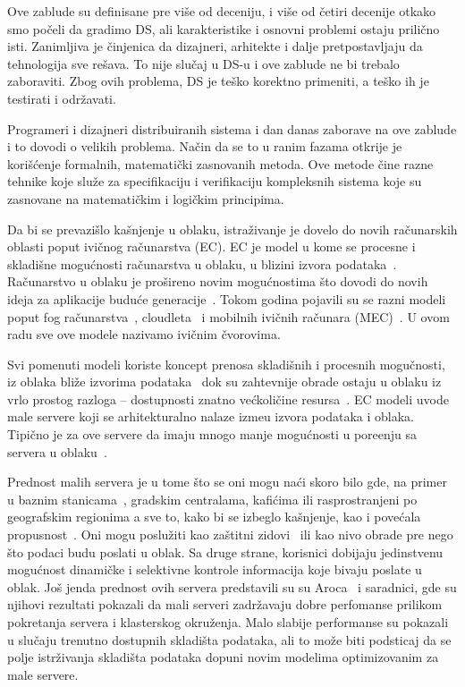 Ove zablude su definisane pre vi\v se od deceniju, i više od \v cetiri decenije otkako smo po\v celi da gradimo DS, ali karakteristike i osnovni problemi ostaju prili\v cno isti. Zanimljiva je \v cinjenica da dizajneri, arhitekte i dalje pretpostavljaju da tehnologija sve re\v sava. To nije slu\v caj u DS-u i ove zablude ne bi trebalo zaboraviti. Zbog ovih problema, DS je te\v sko korektno primeniti, a te\v sko ih je testirati i odr\v zavati.

Programeri i dizajneri distribuiranih sistema i dan danas zaborave na ove zablude i to dovodi o velikih problema. Na\v cin da se to u ranim fazama otkrije je kori\v s\'cenje formalnih, matemati\v cki zasnovanih metoda. Ove metode \v cine razne tehnike koje slu\v ze za specifikaciju i verifikaciju kompleksnih sistema koje su zasnovane na matemati\v ckim i logi\v ckim principima.

Da bi se prevazi\v slo ka\v snjenje u oblaku, istra\v zivanje je dovelo do novih ra\v cunarskih oblasti poput ivi\v cnog ra\v cunarstva (EC). EC je model u kome se procesne i skladi\v sne mogu\'cnosti ra\v cunarstva u oblaku, u blizini izvora podataka~\cite{Satyanarayanan17}. Ra\v cunarstvo u oblaku je pro\v sireno novim mogu\'cnostima \v sto dovodi do novih ideja za aplikacije budu\'ce generacije~\cite{NingLSY20}. Tokom godina pojavili su se razni modeli poput fog ra\v cunarstva~\cite{BonomiMNZ14}, cloudleta~\cite {MonsalveCC18} i mobilnih ivi\v cnih ra\v cunara (MEC)~\cite{WangZZWYW17}. U ovom radu sve ove modele nazivamo ivi\v cnim \v cvorovima. 

Svi pomenuti modeli koriste koncept prenosa skladi\v snih i procesnih mogu\v cnosti, iz oblaka bli\v ze izvorima podataka~\cite{KhuneP19} dok su zahtevnije obrade ostaju u oblaku iz vrlo prostog razloga -- dostupnosti znatno ve\'ckoli\v cine resursa~\cite{NingLSY20}. EC modeli uvode male servere koji se arhitekturalno nalaze izme\dj u izvora podataka i oblaka. Tipi\v cno je za ove servere da imaju mnogo manje mogu\'cnosti u pore\dj enju sa servera u oblaku~\cite{ChenHLLW15}. 

Prednost malih servera je u tome \v sto se oni mogu na\'ci skoro bilo gde, na primer u baznim stanicama~\cite{WangZZWYW17}, gradskim centralama, kafi\'cima ili rasprostranjeni po geografskim regionima a sve to, kako bi se izbeglo kašnjenje, kao i pove\'cala propusnost~\cite{MonsalveCC18}. Oni mogu poslu\v ziti kao za\v stitni zidovi~\cite{SatyanarayananK19} ili kao nivo obrade pre nego \v sto podaci budu poslati u oblak. Sa druge strane, korisnici dobijaju jedinstvenu mogu\'cnost dinami\v cke i selektivne kontrole informacija koje bivaju poslate u oblak. Jo\v s jenda prednost ovih servera predstavili su su Aroca~\cite{ArocaG12} i saradnici, gde su njihovi rezultati pokazali da mali serveri zadr\v zavaju dobre perfomanse prilikom pokretanja servera i klasterskog okru\v zenja. Malo slabije performanse su pokazali u slu\v caju trenutno dostupnih skladi\v sta podataka, ali to mo\v ze biti podsticaj da se polje istr\v zivanja skladi\v sta podataka dopuni novim modelima optimizovanim za male servere.

